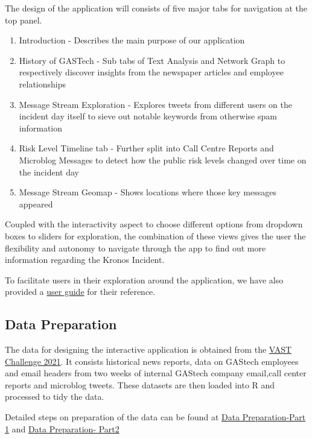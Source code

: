 \documentclass{acm_proc_article-sp}
\providecommand{\tightlist}{%
  \setlength{\itemsep}{0pt}\setlength{\parskip}{0pt}}
\begin{document}
The design of the application will consists of five major tabs for
navigation at the top panel.

\begin{enumerate}
\def\labelenumi{\roman{enumi})}
\tightlist
\item
  Introduction - Describes the main purpose of our application
\item
  History of GASTech - Sub tabs of Text Analysis and Network Graph to
  respectively discover insights from the newspaper articles and
  employee relationships
\item
  Message Stream Exploration - Explores tweets from different users on
  the incident day itself to sieve out notable keywords from otherwise
  spam information
\item
  Risk Level Timeline tab - Further split into Call Centre Reports and
  Microblog Messages to detect how the public risk levels changed over
  time on the incident day
\item
  Message Stream Geomap - Shows locations where those key messages
  appeared
\end{enumerate}

Coupled with the interactivity aspect to choose different options from
dropdown boxes to sliders for exploration, the combination of these
views gives the user the flexibility and autonomy to navigate through
the app to find out more information regarding the Kronos Incident.

To facilitate users in their exploration around the application, we have
also provided a
\href{https://grp15-vast-project.netlify.app/userguide}{user guide} for
their reference.

\hypertarget{data-preparation}{%
\subsection{Data Preparation}\label{data-preparation}}

The data for designing the interactive application is obtained from the
\href{https://vast-challenge.github.io/2021/index.html}{VAST Challenge
2021}. It consists historical news reports, data on GAStech employees
and email headers from two weeks of internal GAStech company email,call
center reports and microblog tweets. These datasets are then loaded into
R and processed to tidy the data.

Detailed steps on preparation of the data can be found at
\href{https://vast-challenge.netlify.app/data_preparation.html}{Data
Preparation-Part 1} and
\href{https://isss608-kytan-vast2021.netlify.app/posts/2021-07-07-mc3/\#preparation}{Data
Preparation- Part2}
\end{document}
